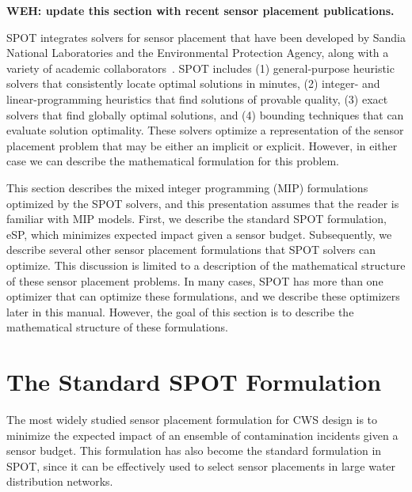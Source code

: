 {\bf WEH: update this section with recent sensor placement publications.}


SPOT integrates solvers for sensor placement that have been developed by Sandia National Laboratories and the Environmental Protection Agency, along with a variety of academic collaborators~\cite{MurUbeJan06,MurBerHar06,CarGreHarKonLauLinMorPhi06,HarBerMurPhiRieWat07,BerHarPhiUbeWat06,BerFleHarPhiWat05}.
SPOT includes (1) general-\/purpose heuristic solvers that
consistently locate optimal solutions in minutes, (2) integer-\/ and
linear-\/programming heuristics that find solutions of provable quality,
(3) exact solvers that find globally optimal solutions, and (4) bounding
techniques that can evaluate solution optimality. These solvers optimize
a representation of the sensor placement problem that may be either
an implicit or explicit. However, in either case we can describe the
mathematical formulation for this problem.

This section describes the mixed integer programming (MIP) formulations optimized by the SPOT solvers, and this presentation assumes that the reader is familiar with MIP models. First, we describe the standard SPOT formulation, eSP, which minimizes expected impact given a sensor budget. Subsequently, we describe several other sensor placement formulations that SPOT solvers can optimize. This discussion is limited to a description of the mathematical structure of these sensor placement problems. In many cases, SPOT has more than one optimizer that can optimize these formulations, and we describe these optimizers later in this manual. However, the goal of this section is to describe the mathematical structure of these formulations.

\section{The Standard SPOT Formulation}\label{formulations_formulationsCanonical}

The most widely studied sensor placement formulation for CWS design is to minimize the expected impact of an ensemble of contamination incidents given a sensor budget. This formulation has also become the standard formulation in SPOT, since it can be effectively used to select sensor placements in large water distribution networks.

